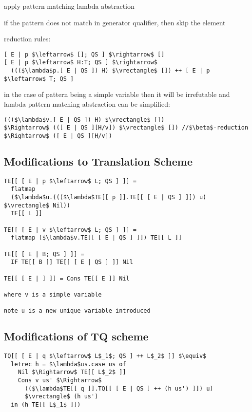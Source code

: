 \documentclass[8pt]{extarticle}
\newcommand*{\vrectangle}{{\setlength{\fboxsep}{0pt}\fbox{\phantom{l}}}}
\begin{document}
\begin{multicols*}{2}
apply pattern matching lambda abstraction

if the pattern does not match in generator qualifier, then skip the element

reduction rules:

\begin{lstlisting}
[ E | p $\leftarrow$ []; QS ] $\rightarrow$ []
[ E | p $\leftarrow$ H:T; QS ] $\rightarrow$
  ((($\lambda$p.[ E | QS ]) H) $\vrectangle$ []) ++ [ E | p $\leftarrow$ T; QS ]
\end{lstlisting}

in the case of pattern being a simple variable then it will be irrefutable and lambda pattern matching abstraction can be simplified:

\begin{lstlisting}
((($\lambda$v.[ E | QS ]) H) $\vrectangle$ [])
$\Rightarrow$ (([ E | QS ][H/v]) $\vrectangle$ []) //$\beta$-reduction
$\Rightarrow$ ([ E | QS ][H/v])
\end{lstlisting}

\subsection{Modifications to Translation Scheme}

\begin{lstlisting}
TE[[ [ E | p $\leftarrow$ L; QS ] ]] =
  flatmap
  ($\lambda$u.((($\lambda$TE[[ p ]].TE[[ [ E | QS ] ]]) u) $\vrectangle$ Nil))
  TE[[ L ]]

TE[[ [ E | v $\leftarrow$ L; QS ] ]] =
  flatmap ($\lambda$v.TE[[ [ E | QS ] ]]) TE[[ L ]]

TE[[ [ E | B; QS ] ]] =
  IF TE[[ B ]] TE[[ [ E | QS ] ]] Nil

TE[[ [ E | ] ]] = Cons TE[[ E ]] Nil

where v is a simple variable

note u is a new unique variable introduced
\end{lstlisting}

\subsection{Modifications of TQ scheme}

\begin{lstlisting}
TQ[[ [ E | q $\leftarrow$ L$_1$; QS ] ++ L$_2$ ]] $\equiv$
  letrec h = $\lambda$us.case us of
    Nil $\Rightarrow$ TE[[ L$_2$ ]]
    Cons v us' $\Rightarrow$
      (($\lambda$TE[[ q ]].TQ[[ [ E | QS ] ++ (h us') ]]) u)
      $\vrectangle$ (h us')
  in (h TE[[ L$_1$ ]])


\end{lstlisting}
\end{multicols*}
\end{document}
